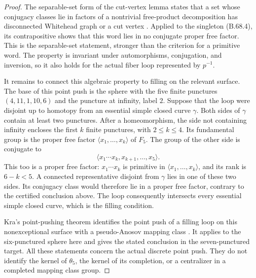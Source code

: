 \begin{proof}
The separable-set form of the cut-vertex lemma states
that a set whose conjugacy classes lie in factors of
a nontrivial free-product decomposition has disconnected
Whitehead graph or a cut vertex
\cite[Corollary~3.5]{DE_HeusenerWeidmann2019}.
Applied to the singleton (B.68.4), its contrapositive
shows that this word lies in no conjugate proper free
factor.  This is the separable-set statement, stronger
than the criterion for a primitive word.
The property is invariant under automorphisms,
conjugation, and inversion, so it also holds for the
actual fiber loop represented by $p^{-1}$.

It remains to connect this algebraic property to
filling on the relevant surface.  The base of this
point push is the sphere with the five finite punctures
$(4,11,1,10,6)$ and the puncture at infinity, label $2$.
Suppose that the loop were disjoint up to homotopy
from an essential simple closed curve $\gamma$.
Both sides of $\gamma$ contain at least two punctures.
After a homeomorphism, the side not containing infinity
encloses the first $k$ finite punctures, with
$2\leq k\leq4$.
Its fundamental group is the proper free factor
$\langle x_1,\ldots,x_k\rangle$ of $F_5$.
The group of the other side is conjugate to
\[
 \langle x_1\cdots x_k,x_{k+1},\ldots,x_5\rangle.
                                                               \tag{B.68.6}
\]
This too is a proper free factor: $x_1\cdots x_k$
is primitive in $\langle x_1,\ldots,x_k\rangle$,
and its rank is $6-k<5$.
A connected representative disjoint from $\gamma$
lies in one of these two sides.  Its conjugacy class
would therefore lie in a proper free factor, contrary
to the certified conclusion above.
The loop consequently intersects every essential
simple closed curve, which is the filling condition.

Kra's point-pushing theorem identifies the point push
of a filling loop on this nonexceptional surface with
a pseudo-Anosov mapping class
\cite[Theorem~2$'$ and Theorem~2(b)]{DE_Kra1981}.
It applies to the six-punctured sphere here and gives
the stated conclusion in the seven-punctured target.
All these statements concern the actual discrete
point push.  They do not identify the kernel of
$\theta_5$, the kernel of its completion, or a
centralizer in a completed mapping class group.
\end{proof}
